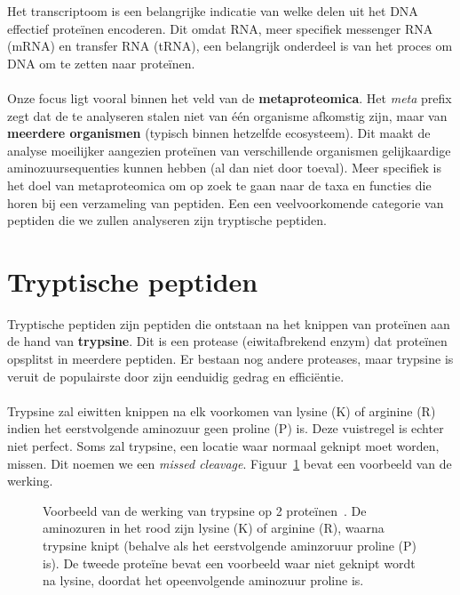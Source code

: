 Het transcriptoom is een belangrijke indicatie van welke delen uit het DNA effectief proteïnen encoderen.
Dit omdat RNA, meer specifiek messenger RNA (mRNA) en transfer RNA (tRNA), een belangrijk onderdeel is van het proces om DNA om te zetten naar proteïnen.
\\ \\
Onze focus ligt vooral binnen het veld van de \textbf{metaproteomica}.
Het \textit{meta} prefix zegt dat de te analyseren stalen niet van één organisme afkomstig zijn, maar van \textbf{meerdere organismen} (typisch binnen hetzelfde ecosysteem).
Dit maakt de analyse moeilijker aangezien proteïnen van verschillende organismen gelijkaardige aminozuursequenties kunnen hebben (al dan niet door toeval).
Meer specifiek is het doel van metaproteomica om op zoek te gaan naar de taxa en functies die horen bij een verzameling van peptiden.
Een een veelvoorkomende categorie van peptiden die we zullen analyseren zijn tryptische peptiden.


\section{Tryptische peptiden}\label{sec:tryptische-peptiden}
Tryptische peptiden zijn peptiden die ontstaan na het knippen van proteïnen aan de hand van \textbf{trypsine}.
Dit is een protease (eiwitafbrekend enzym) dat proteïnen opsplitst in meerdere peptiden.
Er bestaan nog andere proteases, maar trypsine is veruit de populairste door zijn eenduidig gedrag en efficiëntie.
\\ \\
Trypsine zal eiwitten knippen na elk voorkomen van lysine (K) of arginine (R) indien het eerstvolgende aminozuur geen proline (P) is.
Deze vuistregel is echter niet perfect.
Soms zal trypsine, een locatie waar normaal geknipt moet worden, missen.
Dit noemen we een \textit{missed cleavage}.
Figuur~\ref{fig:trypsine} bevat een voorbeeld van de werking.

\begin{figure}[H]
    \centering
    
    \caption{Voorbeeld van de werking van trypsine op 2 proteïnen~\cite{phdPieterUnipept}. De aminozuren in het rood zijn lysine (K) of arginine (R), waarna trypsine knipt (behalve als het eerstvolgende aminzoruur proline (P) is). De tweede proteïne bevat een voorbeeld waar niet geknipt wordt na lysine, doordat het opeenvolgende aminozuur proline is.}
    \label{fig:trypsine}
\end{figure}

